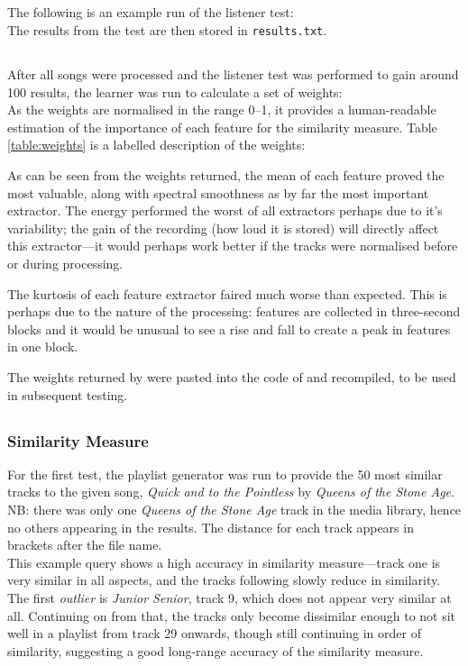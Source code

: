 \subsection{}
The following is an example run of the listener test:\\

The results from the test are then stored in \texttt{results.txt}.
\subsection{}
After all songs were processed and the listener test was performed to gain around 100 results, the learner was run to calculate a set of weights:\\

As the weights are normalised in the range 0--1, it provides a human-readable estimation of the importance of each feature for the similarity measure. Table \ref{table:weights} is a labelled description of the weights:


As can be seen from the weights returned, the mean of each feature proved the most valuable, along with spectral smoothness as by far the most important extractor. The energy performed the worst of all extractors perhaps due to it's variability; the gain of the recording (how loud it is stored) will directly affect this extractor---it would perhaps work better if the tracks were normalised before or during processing.

The kurtosis of each feature extractor faired much worse than expected. This is perhaps due to the nature of the processing: features are collected in three-second blocks and it would be unusual to see a rise and fall to create a peak in features in one block.

The weights returned by  were pasted into the code of  and recompiled, to be used in subsequent testing.
\pagebreak
\subsection{}
\subsubsection{Similarity Measure}
For the first test, the playlist generator was run to provide the 50 most similar tracks to the given song, \emph{Quick and to the Pointless} by \emph{Queens of the Stone Age}. NB: there was only one \emph{Queens of the Stone Age} track in the media library, hence no others appearing in the results. The distance for each track appears in brackets after the file name.\\

This example query shows a high accuracy in similarity measure---track one is very similar in all aspects, and the tracks following slowly reduce in similarity. The first \emph{outlier} is \emph{Junior Senior}, track 9, which does not appear very similar at all. Continuing on from that, the tracks only become dissimilar enough to not sit well in a playlist from track 29 onwards, though still continuing in order of similarity, suggesting a good long-range accuracy of the similarity measure. 
